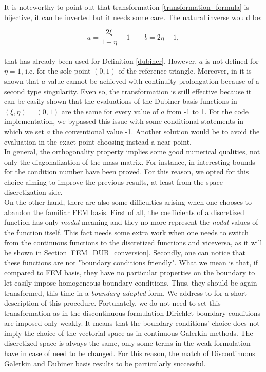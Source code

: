 \documentclass[a4paper,11pt]{article}
\begin{document}
    \noindent It is noteworthy to point out that transformation \ref{transformation_formula} is bijective, it can be inverted but it needs some care. The natural inverse would be:
    
    \begin{equation*}
    a = \frac{2\xi}{1-\eta}-1 \quad \quad b = 2\eta-1,
    \end{equation*}
    \vspace{2mm} \\
    \noindent that has already been used for Definition \ref{dubiner}. However, $a$ is not defined for $\eta=1$, i.e. for the sole point $(0,1)$ of the reference triangle. Moreover, in \cite{sherwin} it is shown that $a$ value cannot be achieved with continuity prolongation because of a second type singularity. Even so, the transformation is still effective because it can be easily shown that the evaluations of the Dubiner basis functions in $(\xi,\eta)=(0,1)$ are the same for every value of $a$ from -1 to 1. For the code implementation, we bypassed this issue with some conditional statements in which we set $a$ the conventional value -1. Another solution would be to avoid the evaluation in the exact point choosing instead a near point.\\
    
    \noindent In general, the orthogonality property implies some good numerical qualities, not only the diagonalization of the mass matrix. For instance, in \cite{antonietti} interesting bounds for the condition number have been proved. For this reason, we opted for this choice aiming to improve the previous results, at least from the space discretization side. \\
    
    \noindent On the other hand, there are also some difficulties arising when one chooses to abandon the familiar FEM basis. First of all, the coefficients of a discretized function has only \emph{modal} meaning and they no more represent the \emph{nodal} values of the function itself. This fact needs some extra work when one needs to switch from the continuous functions to the discretized functions and viceversa, as it will be shown in Section \ref{FEM_DUB_conversion}. Secondly, one can notice that these functions are not "boundary conditions friendly". What we mean is that, if compared to FEM basis, they have no particular properties on the boundary to let easily impose homogeneous boundary conditions. Thus, they should be again transformed, this time in a \emph{boundary adapted} form. We address to \cite{napde} for a short description of this procedure. Fortunately, we do not need to set this transformation as in the discontinuous formulation Dirichlet boundary conditions are imposed only weakly. It means that the boundary conditions' choice does not imply the choice of the vectorial space as in continuous Galerkin methods. The discretized space is always the same, only some terms in the weak formulation have in case of need to be changed. For this reason, the match of Discontinuous Galerkin and Dubiner basis results to be particularly successful. \\
    
\end{document}
